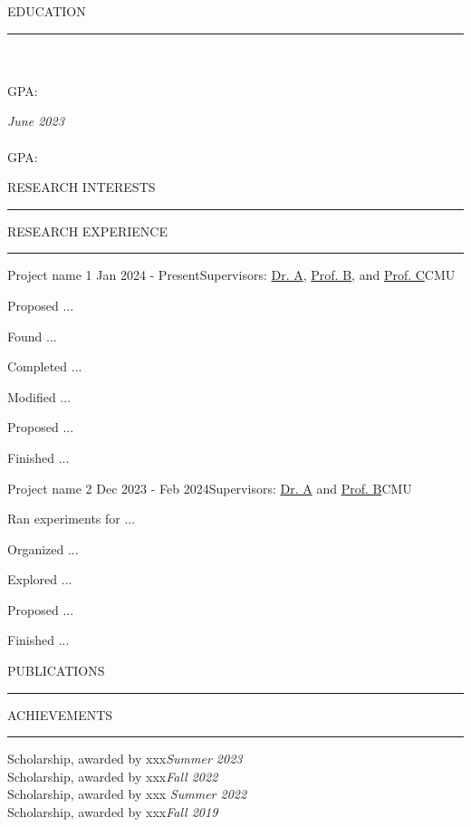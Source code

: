 \documentclass{resume} %
\renewenvironment{rSection}[1]{
\sectionskip
\textcolor{CarnegieMellonRed}{\MakeUppercase{#1}}
\sectionlineskip
\hrule
\begin{list}{}{
\setlength{\leftmargin}{1.5em}
}
\item[]
}{
\end{list}
}
\begin{document}
\begin{rSection}{Education}
{\bf } \hfill {\em } 
\\\hfill
\\ GPA:  \hfill
\\ \textit{}

{\bf } \hfill {\em June 2023} 
\\ 
\\ \qquad GPA: \qquad  \hfill
\\ \textit{ 
}

\end{rSection}

\begin{rSection}{Research Interests}

\end{rSection}


\begin{rSection}{Research Experience}
\begin{rSubsection}{Project name 1 \cite{paper1}}{Jan 2024 - Present}{Supervisors: \href{https://example.com/}{Dr. A}, \href{https://example.com/}{Prof. B}, and \href{https://example.com/}{Prof. C}}{CMU}
\item Proposed ...
\item Found ...
\item Completed ...
\item Modified ...
\item Proposed ...
\item Finished ...
\end{rSubsection}


\begin{rSubsection}{Project name 2 \cite{paper2}}{Dec 2023 - Feb 2024}{Supervisors: \href{https://example.weebly.com/}{Dr. A} and \href{https://www.ece.cmu.edu/directory/bios/example}{Prof. B}}{CMU}
\item Ran experiments for ...
\item Organized ...
\item Explored ... 
\item Proposed ...
\item Finished ...
\end{rSubsection}
\end{rSection}


\begin{rSection}{Publications} \itemsep -2pt

\leavevmode\printbibliography[heading=none]

\end{rSection}
\newpage
\begin{rSection}{Achievements} \itemsep -2pt
{Scholarship, awarded by xxx}\hfill {\em Summer 2023} \\
{Scholarship, awarded by xxx}\hfill {\em Fall 2022} \\
{Scholarship, awarded by xxx} \hfill {\em Summer 2022} \\
{Scholarship, awarded by xxx}\hfill {\em Fall 2019}
\end{rSection}
\end{document}
